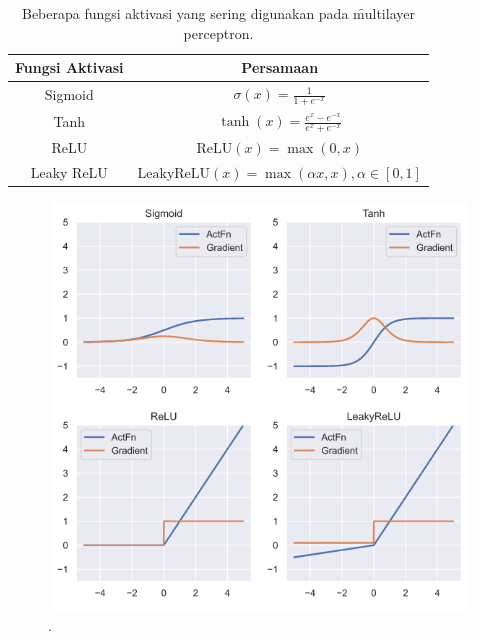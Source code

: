     \begin{table}
        \centering
        \caption{Beberapa fungsi aktivasi yang sering digunakan pada \f{multilayer perceptron}.}
        \label{tab:activation-function}
        \begin{tabular}{|c|c|}
            \hline
            \textbf{Fungsi Aktivasi} & \textbf{Persamaan} \\
            \hline
            \hline
            Sigmoid & $\sigma(x) = \frac{1}{1 + e^{-x}}$ \\
            \hline
            Tanh & $\tanh(x) = \frac{e^x - e^{-x}}{e^x + e^{-x}}$ \\
            \hline
            ReLU & $\text{ReLU}(x) = \max(0, x)$ \\
            \hline
            Leaky ReLU & $\text{LeakyReLU}(x) = \max(\alpha x, x), \alpha \in [0, 1]$ \\
            \hline
        \end{tabular}
    \end{table}
    
    \begin{figure}
        \centering
        \includegraphics[width=1\textwidth]{assets/pics/act_function.png}
        \caption{\license.}
        \label{fig:activation-function}
    \end{figure}


